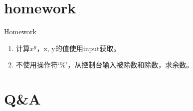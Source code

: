 \documentclass{beamer}
\begin{document}
\section{homework}
\begin{frame}{Homework}
\begin{enumerate}
\item
计算$x^{y}$，x, y的值使用input获取。
\item
不使用操作符‘\%’，从控制台输入被除数和除数，求余数。
\end{enumerate}
\end{frame}
\section{Q\&A}
\begin{frame}
\end{frame}


%
\end{document}
